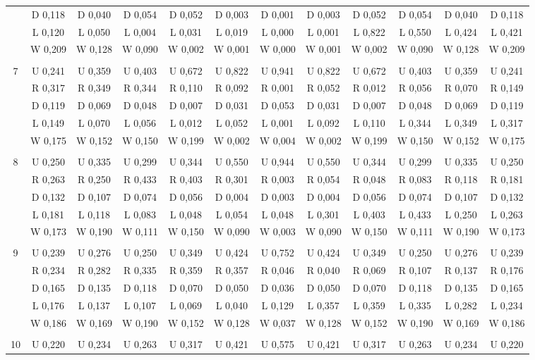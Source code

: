 \documentclass{article}
\begin{document}
\begin{table}[htbp]
\begin{footnotesize}
\begin{tabular}{c|c|c|c|c|c|c|c|c|c|c|c|}
&D 0,118&D 0,040&D 0,054&D 0,052&D 0,003&D 0,001&D 0,003&D 0,052&D 0,054&D 0,040&D 0,118\\
&L 0,120&L 0,050&L 0,004&L 0,031&L 0,019&L 0,000&L 0,001&L 0,822&L 0,550&L 0,424&L 0,421\\
&W 0,209&W 0,128&W 0,090&W 0,002&W 0,001&W 0,000&W 0,001&W 0,002&W 0,090&W 0,128&W 0,209\\
\hline \\
7&U 0,241&U 0,359&U 0,403&U 0,672&U 0,822&U 0,941&U 0,822&U 0,672&U 0,403&U 0,359&U 0,241\\
&R 0,317&R 0,349&R 0,344&R 0,110&R 0,092&R 0,001&R 0,052&R 0,012&R 0,056&R 0,070&R 0,149\\
&D 0,119&D 0,069&D 0,048&D 0,007&D 0,031&D 0,053&D 0,031&D 0,007&D 0,048&D 0,069&D 0,119\\
&L 0,149&L 0,070&L 0,056&L 0,012&L 0,052&L 0,001&L 0,092&L 0,110&L 0,344&L 0,349&L 0,317\\
&W 0,175&W 0,152&W 0,150&W 0,199&W 0,002&W 0,004&W 0,002&W 0,199&W 0,150&W 0,152&W 0,175\\
\hline \\
8&U 0,250&U 0,335&U 0,299&U 0,344&U 0,550&U 0,944&U 0,550&U 0,344&U 0,299&U 0,335&U 0,250\\
&R 0,263&R 0,250&R 0,433&R 0,403&R 0,301&R 0,003&R 0,054&R 0,048&R 0,083&R 0,118&R 0,181\\
&D 0,132&D 0,107&D 0,074&D 0,056&D 0,004&D 0,003&D 0,004&D 0,056&D 0,074&D 0,107&D 0,132\\
&L 0,181&L 0,118&L 0,083&L 0,048&L 0,054&L 0,048&L 0,301&L 0,403&L 0,433&L 0,250&L 0,263\\
&W 0,173&W 0,190&W 0,111&W 0,150&W 0,090&W 0,003&W 0,090&W 0,150&W 0,111&W 0,190&W 0,173\\
\hline \\
9&U 0,239&U 0,276&U 0,250&U 0,349&U 0,424&U 0,752&U 0,424&U 0,349&U 0,250&U 0,276&U 0,239\\
&R 0,234&R 0,282&R 0,335&R 0,359&R 0,357&R 0,046&R 0,040&R 0,069&R 0,107&R 0,137&R 0,176\\
&D 0,165&D 0,135&D 0,118&D 0,070&D 0,050&D 0,036&D 0,050&D 0,070&D 0,118&D 0,135&D 0,165\\
&L 0,176&L 0,137&L 0,107&L 0,069&L 0,040&L 0,129&L 0,357&L 0,359&L 0,335&L 0,282&L 0,234\\
&W 0,186&W 0,169&W 0,190&W 0,152&W 0,128&W 0,037&W 0,128&W 0,152&W 0,190&W 0,169&W 0,186\\
\hline \\
10&U 0,220&U 0,234&U 0,263&U 0,317&U 0,421&U 0,575&U 0,421&U 0,317&U 0,263&U 0,234&U 0,220\\

\end{tabular}
\end{footnotesize}
\end{table}
\end{document}
